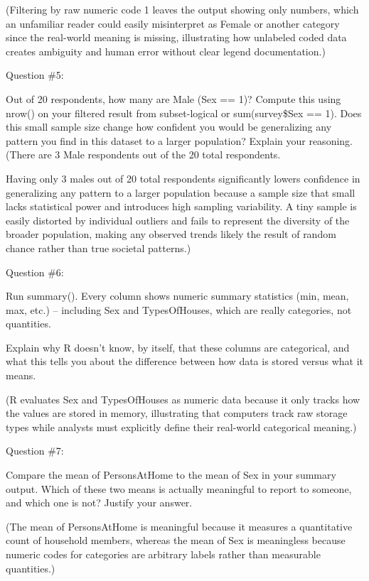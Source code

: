 \documentclass[
]{article}
\begin{document}
(Filtering by raw numeric code 1 leaves the output showing only numbers,
which an unfamiliar reader could easily misinterpret as Female or
another category since the real-world meaning is missing, illustrating
how unlabeled coded data creates ambiguity and human error without clear
legend documentation.)

Question \#5:

Out of 20 respondents, how many are Male (Sex == 1)? Compute this using
nrow() on your filtered result from subset-logical or sum(survey\$Sex ==
1). Does this small sample size change how confident you would be
generalizing any pattern you find in this dataset to a larger
population? Explain your reasoning. (There are 3 Male respondents out of
the 20 total respondents.

Having only 3 males out of 20 total respondents significantly lowers
confidence in generalizing any pattern to a larger population because a
sample size that small lacks statistical power and introduces high
sampling variability. A tiny sample is easily distorted by individual
outliers and fails to represent the diversity of the broader population,
making any observed trends likely the result of random chance rather
than true societal patterns.)

Question \#6:

Run summary(). Every column shows numeric summary statistics (min, mean,
max, etc.) -- including Sex and TypesOfHouses, which are really
categories, not quantities.

Explain why R doesn't know, by itself, that these columns are
categorical, and what this tells you about the difference between how
data is stored versus what it means.

(R evaluates Sex and TypesOfHouses as numeric data because it only
tracks how the values are stored in memory, illustrating that computers
track raw storage types while analysts must explicitly define their
real-world categorical meaning.)

Question \#7:

Compare the mean of PersonsAtHome to the mean of Sex in your summary
output. Which of these two means is actually meaningful to report to
someone, and which one is not? Justify your answer.

(The mean of PersonsAtHome is meaningful because it measures a
quantitative count of household members, whereas the mean of Sex is
meaningless because numeric codes for categories are arbitrary labels
rather than measurable quantities.)
\end{document}
